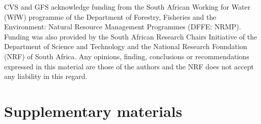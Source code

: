\documentclass[
  authoryear,
  preprint,
  3p,
  twocolumn]{elsarticle}
\begin{document}
CVS and GFS acknowledge funding from the South African Working for Water
(WfW) programme of the Department of Forestry, Fisheries and the
Environment: Natural Resource Management Programmes (DFFE: NRMP).
Funding was also provided by the South African Research Chairs
Initiative of the Department of Science and Technology and the National
Research Foundation (NRF) of South Africa. Any opinions, finding,
conclusions or recommendations expressed in this material are those of
the authors and the NRF does not accept any liability in this regard.

\hypertarget{supplementary-materials}{%
\section{Supplementary materials}\label{supplementary-materials}}


\renewcommand\refname{References}
  
\end{document}
